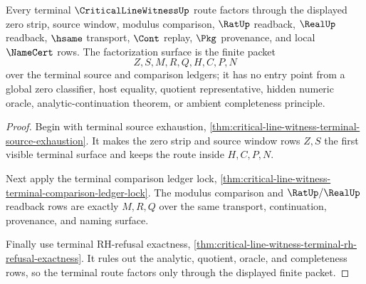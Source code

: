 \begin{theorem}
\label{thm:critical-line-witness-terminal-window-factorization}
Every terminal $\CriticalLineWitnessUp$ route factors through the displayed zero
strip, source window, modulus comparison, $\RatUp$ readback, $\RealUp$ readback,
$\hsame$ transport, $\Cont$ replay, $\Pkg$ provenance, and local $\NameCert$
rows. The factorization surface is the finite packet
$$
Z,S,M,R,Q,H,C,P,N
$$
over the terminal source and comparison ledgers; it has no entry point from a
global zero classifier, host equality, quotient representative, hidden numeric
oracle, analytic-continuation theorem, or ambient completeness principle.
\end{theorem}
\begin{proof}
Begin with terminal source exhaustion,
\autoref{thm:critical-line-witness-terminal-source-exhaustion}. It makes the
zero strip and source window rows $Z,S$ the first visible terminal surface and
keeps the route inside $H,C,P,N$.

Next apply the terminal comparison ledger lock,
\autoref{thm:critical-line-witness-terminal-comparison-ledger-lock}. The
modulus comparison and $\RatUp/\RealUp$ readback rows are exactly $M,R,Q$ over
the same transport, continuation, provenance, and naming surface.

Finally use terminal RH-refusal exactness,
\autoref{thm:critical-line-witness-terminal-rh-refusal-exactness}. It rules out
the analytic, quotient, oracle, and completeness rows, so the terminal route
factors only through the displayed finite packet.
\end{proof}

